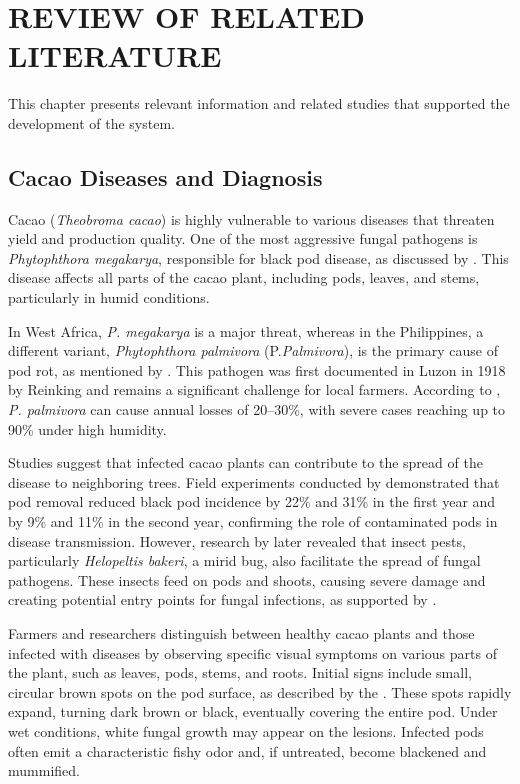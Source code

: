 \chapter{REVIEW OF RELATED LITERATURE}
This chapter presents relevant information and related studies that supported the development of the system.

\section{Cacao Diseases and Diagnosis}
Cacao (\textit{Theobroma cacao}) is highly vulnerable to various diseases that threaten yield and production quality. One of the most aggressive fungal pathogens is \textit{Phytophthora megakarya}, responsible for black pod disease, as discussed by \cite{Andrews1997}. This disease affects all parts of the cacao plant, including pods, leaves, and stems, particularly in humid conditions.

In West Africa, \textit{P. megakarya} is a major threat, whereas in the Philippines, a different variant, \textit{Phytophthora palmivora} (P.\textit{Palmivora}), is the primary cause of pod rot, as mentioned by \cite{Solpot2020}. This pathogen was first documented in Luzon in 1918 by Reinking and remains a significant challenge for local farmers. According to \cite{AceboGuerrero2012}, \textit{P. palmivora} can cause annual losses of 20–30\%, with severe cases reaching up to 90\% under high humidity.

Studies suggest that infected cacao plants can contribute to the spread of the disease to neighboring trees. Field experiments conducted by \cite{Ndoumbe2004} demonstrated that pod removal reduced black pod incidence by 22\% and 31\% in the first year and by 9\% and 11\% in the second year, confirming the role of contaminated pods in disease transmission. However, research by \cite{Babin2018} later revealed that insect pests, particularly \textit{Helopeltis bakeri}, a mirid bug, also facilitate the spread of fungal pathogens. These insects feed on pods and shoots, causing severe damage and creating potential entry points for fungal infections, as supported by \cite{Guest2007}.

Farmers and researchers distinguish between healthy cacao plants and those infected with diseases by observing specific visual symptoms on various parts of the plant, such as leaves, pods, stems, and roots. Initial signs include small, circular brown spots on the pod surface, as described by the \cite{MinistryAgri}. These spots rapidly expand, turning dark brown or black, eventually covering the entire pod. Under wet conditions, white fungal growth may appear on the lesions. Infected pods often emit a characteristic fishy odor and, if untreated, become blackened and mummified.

